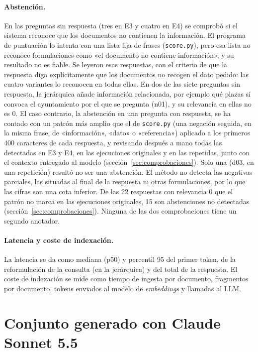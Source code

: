 \paragraph{Abstención.} En las preguntas sin respuesta (tres en E3 y cuatro en E4) se comprobó si el sistema reconoce que los documentos no contienen la información. El programa de puntuación lo intenta con una lista fija de frases (\texttt{score.py}), pero esa lista no reconoce formulaciones como «el documento no contiene información», y su resultado no es fiable. Se leyeron esas respuestas, con el criterio de que la respuesta diga explícitamente que los documentos no recogen el dato pedido: las cuatro variantes lo reconocen en todas ellas. En dos de las siete preguntas sin respuesta, la jerárquica añade información relacionada, por ejemplo qué plazas sí convoca el ayuntamiento por el que se pregunta (n01), y su relevancia en ellas no es 0. El caso contrario, la abstención en una pregunta con respuesta, se ha contado con un patrón más amplio que el de \texttt{score.py} (una negación seguida, en la misma frase, de «información», «dato» o «referencia») aplicado a los primeros 400 caracteres de cada respuesta, y revisando después a mano todas las detectadas en E3 y E4, en las ejecuciones originales y en las repetidas, junto con el contexto entregado al modelo (sección~\ref{sec:comprobaciones}). Solo una (d03, en una repetición) resultó no ser una abstención. El método no detecta las negativas parciales, las situadas al final de la respuesta ni otras formulaciones, por lo que las cifras son una cota inferior. De las 22 respuestas con relevancia 0 que el patrón no marca en las ejecuciones originales, 15 son abstenciones no detectadas (sección~\ref{sec:comprobaciones}). Ninguna de las dos comprobaciones tiene un segundo anotador.

\paragraph{Latencia y coste de indexación.} La latencia se da como mediana (p50) y percentil 95 del primer token, de la reformulación de la consulta (en la jerárquica) y del total de la respuesta. El coste de indexación se mide como tiempo de ingesta por documento, fragmentos por documento, tokens enviados al modelo de \emph{embeddings} y llamadas al LLM.

\section{Conjunto generado con Claude Sonnet 5.5}
\label{sec:ap-e5}

